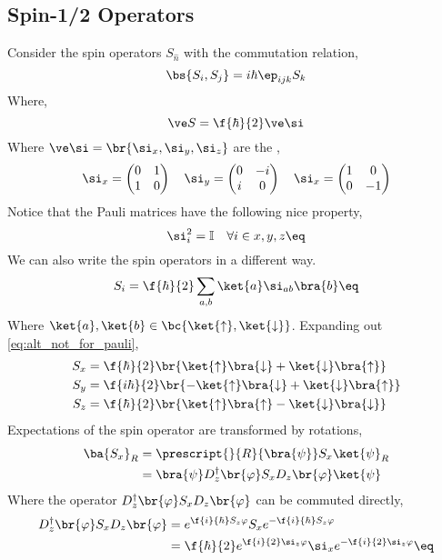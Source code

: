 \documentclass{article}
\begin{document}
\subsection{Spin-1/2 Operators}
Consider the spin operators $S_{\hat{n}}$ with the commutation relation,
\[ \bs{S_i, S_j} = i \hbar \ep_{ijk} S_k \]
Where,
\[ \ve S = \f{\hbar}{2} \ve \si \]
Where $\ve \si = \br{\si_x, \si_y, \si_z}$ are the ,
\[ \si_x = \begin{pmatrix}0 & 1 \\ 1 & 0 \end{pmatrix} \quad \si_y = \begin{pmatrix}0 & -i \\ i & 0 \end{pmatrix} \quad \si_x = \begin{pmatrix}1 & 0 \\ 0 & -1 \end{pmatrix} \]
Notice that the Pauli matrices have the following nice property,
\[ \si_i^2 = \mathbb{I} \quad \forall i \in x,y,z \eq \label{eq:pauli_squared_ident} \]
We can also write the spin operators in a different way.
\[ S_i = \f{\hbar}{2} \sum_{a,b} \ket{a} \si_{ab} \bra{b} \eq \label{eq:alt_not_for_pauli}\]
Where $\ket{a}, \ket{b} \in \bc{\ket{\uparrow}, \ket{\downarrow}}$. Expanding out \cref{eq:alt_not_for_pauli},
\begin{align*}
    S_x &= \f{\hbar}{2}\br{\ket{\uparrow}\bra{\downarrow} + \ket{\downarrow}\bra{\uparrow}} \\
    S_y &= \f{i\hbar}{2}\br{-\ket{\uparrow}\bra{\downarrow} + \ket{\downarrow}\bra{\uparrow}} \\
    S_z &= \f{\hbar}{2}\br{\ket{\uparrow}\bra{\uparrow} - \ket{\downarrow}\bra{\downarrow}}
\end{align*}
Expectations of the spin operator are transformed by rotations,
\begin{align*}
    \ba{S_x}_R &= \prescript{}{R}{\bra{\psi}} S_x \ket{\psi}_R \\
    &= \bra{\psi} D^{\dagger}_z\br{\varphi} S_x D_z\br{\varphi} \ket{\psi}
\end{align*}
Where the operator $D^{\dagger}_z\br{\varphi} S_x D_z\br{\varphi}$ can be commuted directly,
\begin{align*}
    D^{\dagger}_z\br{\varphi} S_x D_z\br{\varphi} &= e^{\f{i}{\hbar} S_z \varphi } S_x e^{-\f{i}{\hbar} S_z \varphi } \\
    &= \f{\hbar}{2} e^{\f{i}{2} \si_z \varphi } \si_x e^{-\f{i}{2} \si_z \varphi } \eq \label{eq:return_to}
\end{align*}
\end{document}
